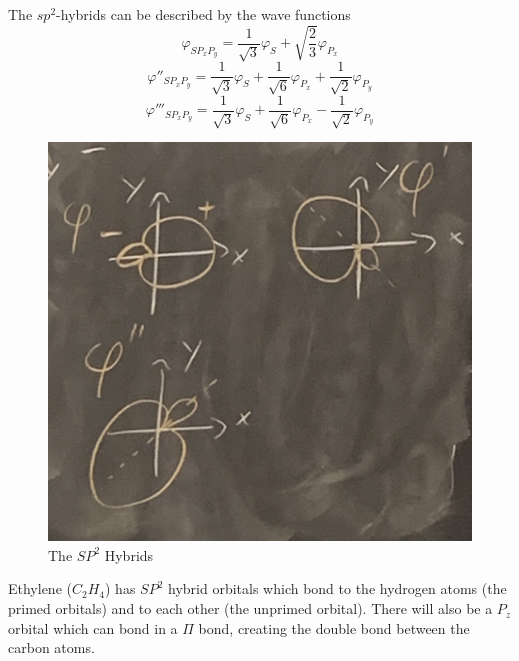 \documentclass[a4paper,twoside,master.tex]{subfiles}
\begin{document}
The $ sp^2 $-hybrids can be described by the wave functions
\begin{equation}
    \varphi_{SP_xP_y} = \frac{1}{\sqrt{3}} \varphi_S + \sqrt{\frac{2}{3}} \varphi_{P_x}
\end{equation}
\begin{equation}
    \varphi''_{SP_xP_y} = \frac{1}{\sqrt{3}} \varphi_S + \frac{1}{\sqrt{6}} \varphi_{P_x} + \frac{1}{\sqrt{2}} \varphi_{P_y} 
\end{equation}
\begin{equation}
    \varphi'''_{SP_xP_y} = \frac{1}{\sqrt{3}} \varphi_S + \frac{1}{\sqrt{6}} \varphi_{P_x} - \frac{1}{\sqrt{2}} \varphi_{P_y} 
\end{equation}

\begin{figure}[h]
    \centering
    \includegraphics[width=\textwidth/2]{figures/lec_45_sp2.jpg}
    \caption{The $ SP^2 $ Hybrids}
    \label{fig:sp2_hybrids}
\end{figure}

\begin{ex}
    Ethylene ($ C_2 H_4 $) has $ SP^2 $ hybrid orbitals which bond to the hydrogen atoms (the primed orbitals) and to each other (the unprimed orbital). There will also be a $ P_z $ orbital which can bond in a $ \Pi $ bond, creating the double bond between the carbon atoms.
\end{ex}
\end{document}
